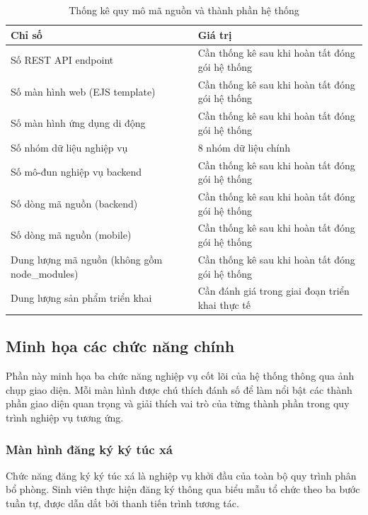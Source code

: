 \documentclass[../DoAn.tex]{subfiles}
\begin{document}
\begin{table}[H]
\centering
\caption{Thống kê quy mô mã nguồn và thành phần hệ thống}
\label{tab:stats}
\small
\begin{tabular}{|p{6.4cm}|p{7.0cm}|}
\hline
\textbf{Chỉ số} & \textbf{Giá trị} \\
\hline
Số REST API endpoint & Cần thống kê sau khi hoàn tất đóng gói hệ thống \\
\hline
Số màn hình web (EJS template) & Cần thống kê sau khi hoàn tất đóng gói hệ thống \\
\hline
Số màn hình ứng dụng di động & Cần thống kê sau khi hoàn tất đóng gói hệ thống \\
\hline
Số nhóm dữ liệu nghiệp vụ & 8 nhóm dữ liệu chính \\
\hline
Số mô-đun nghiệp vụ backend & Cần thống kê sau khi hoàn tất đóng gói hệ thống \\
\hline
Số dòng mã nguồn (backend) & Cần thống kê sau khi hoàn tất đóng gói hệ thống \\
\hline
Số dòng mã nguồn (mobile) & Cần thống kê sau khi hoàn tất đóng gói hệ thống \\
\hline
Dung lượng mã nguồn (không gồm node\_modules) & Cần thống kê sau khi hoàn tất đóng gói hệ thống \\
\hline
Dung lượng sản phẩm triển khai & Cần đánh giá trong giai đoạn triển khai thực tế \\
\hline
\end{tabular}
\end{table}

\subsection{Minh họa các chức năng chính}
\label{subsec:demo}

Phần này minh họa ba chức năng nghiệp vụ cốt lõi của hệ thống thông qua ảnh
chụp giao diện. Mỗi màn hình được chú thích đánh số để làm nổi bật các thành
phần giao diện quan trọng và giải thích vai trò của từng thành phần trong quy
trình nghiệp vụ tương ứng.

\subsubsection{Màn hình đăng ký ký túc xá}

Chức năng đăng ký ký túc xá là nghiệp vụ khởi đầu của toàn bộ quy trình phân
bổ phòng. Sinh viên thực hiện đăng ký thông qua biểu mẫu tổ chức theo ba bước
tuần tự, được dẫn dắt bởi thanh tiến trình tương tác.
\end{document}
